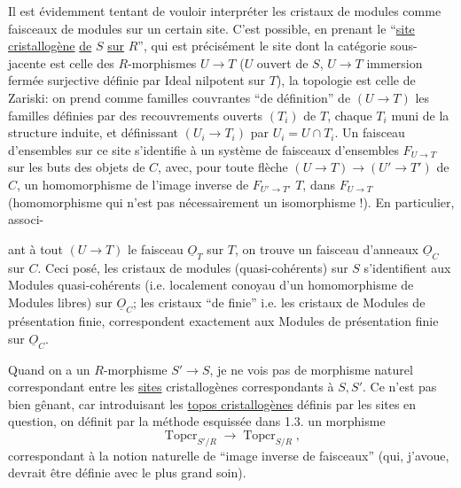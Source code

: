 Il est évidemment tentant de vouloir interpréter les cristaux de modules comme faisceaux de modules sur un certain site. C'est possible, en prenant le ``\uline{site cristallogène} \uline{de} $S$ \uline{sur} $R$'', qui est précisément le site dont la catégorie sous-jacente  est celle des $R$-morphismes $U\longrightarrow T$ ($U$ ouvert de $S$, $U\longrightarrow T$ immersion fermée surjective définie par Ideal nilpotent sur $T$), la topologie est celle de Zariski: on prend comme familles couvrantes ``de définition'' de $(U\longrightarrow T)$ les familles définies par des recouvrements ouverts $(T_i)$ de $T$, chaque $T_i$ muni de la structure induite, et définissant $(U_i\longrightarrow T_i)$ par $U_i=U\cap T_i$. Un faisceau d'ensembles sur ce site s'identifie à un système de faisceaux d'ensembles $F_{U\to T}$ sur les  buts des objets de $C$, avec, pour toute flèche $(U\longrightarrow T)\longrightarrow(U'\longrightarrow T')$ de $C$, un homomorphisme de l'image inverse de $F_{U'\to T'}$    $T$, dans $F_{U\to T}$ (homomorphisme qui n'est pas nécessairement un isomorphisme !). En particulier, associ-


ant  à tout $(U\to T)$ le faisceau $\underline{O}_T$ sur $T$, on trouve un faisceau d'anneaux $\underline{O}_C$ sur $C$. Ceci posé, les cristaux de modules (quasi-cohérents) sur $S$ s'identifient aux Modules quasi-cohérents (i.e. localement conoyau d'un homomorphisme de Modules libres) sur $\underline{O}_C$; les cristaux ``de   finie'' i.e. les cristaux de Modules de présentation finie, correspondent exactement aux Modules de présentation finie sur $\underline{O}_C$.

Quand on a un $R$-morphisme $S'\longrightarrow S$, je ne vois pas de morphisme naturel correspondant entre les \uline{sites} cristallogènes correspondants à $S,S'$. Ce n'est pas bien gênant, car introduisant les \uline{topos cristallogènes}  définis par les sites en question, on définit par la méthode esquissée dans 1.3. un morphisme
\[
\operatorname{Topcr}_{S'/R}\longrightarrow\operatorname{Topcr}_{S/R},
\]
correspondant à la notion naturelle de ``image inverse de faisceaux''  (qui, j'avoue, devrait être définie avec le plus grand soin).

